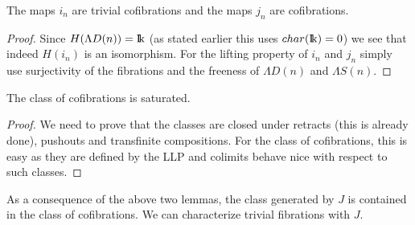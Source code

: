 
\begin{lemma}
	The maps $i_n$ are trivial cofibrations and the maps $j_n$ are cofibrations.
\end{lemma}
\begin{proof}
	Since $H(\Lambda D(n)) = \mathrm{I\!k}$ (as stated earlier this uses \linebreak $char({\mathrm{I\!k}}) = 0$) we see that indeed $H(i_n)$ is an isomorphism. For the lifting property of $i_n$ and $j_n$ simply use surjectivity of the fibrations and the freeness of $\Lambda D(n)$ and $\Lambda S(n)$.
\end{proof}

\begin{lemma}
	The class of cofibrations is saturated.
\end{lemma}
\begin{proof}
	We need to prove that the classes are closed under retracts (this is already done), pushouts and transfinite compositions. For the class of cofibrations, this is easy as they are defined by the LLP and colimits behave nice with respect to such classes. 
\end{proof}

As a consequence of the above two lemmas, the class generated by $J$ is contained in the class of cofibrations. We can characterize trivial fibrations with $J$.

